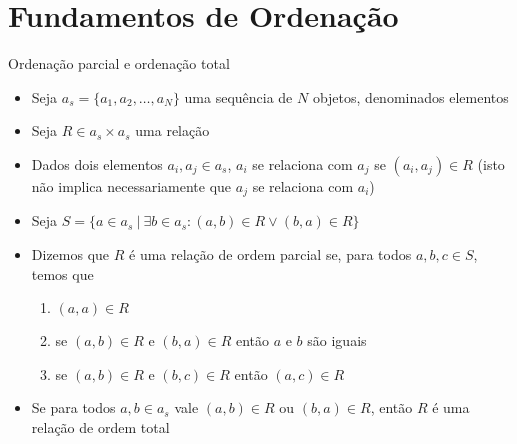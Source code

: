 \section{Fundamentos de Ordenação}

\begin{frame}[fragile]{Ordenação parcial e ordenação total}

    \begin{itemize}
        \item Seja $a_s = \lbrace a_1, a_2, \ldots, a_N\rbrace $ uma sequência de 
        $N$ objetos, denominados elementos

        \item Seja $R\in a_s\times a_s$ uma relação 

        \item Dados dois elementos $a_i, a_j\in a_s$, $a_i$ se relaciona com $a_j$ se 
            $(a_i, a_j)\in R$ (isto não implica necessariamente que $a_j$ se relaciona com
            $a_i$)

        \item Seja $S = \lbrace a\in a_s\ | \ \exists b\in a_s : (a, b)\in R \vee (b, a)\in R
            \rbrace$

        \item Dizemos que $R$ é uma relação de ordem parcial se, para todos $a, b, c\in S$, 
            temos que
            \begin{enumerate}
                \item $(a, a)\in R$
                \item se $(a, b)\in R$ e $(b, a)\in R$ então $a$ e $b$ são iguais
                \item se $(a, b)\in R$ e $(b, c)\in R$ então $(a, c)\in R$
            \end{enumerate}

        \item Se para todos $a, b\in a_s$ vale $(a, b)\in R$ ou $(b, a)\in R$, então $R$ é uma
            relação de ordem total
    \end{itemize}

\end{frame}

